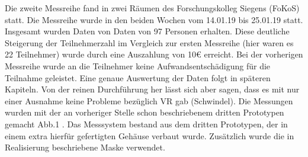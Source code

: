 

Die zweite Messreihe fand in zwei Räumen des Forschungskolleg Siegens (FoKoS) statt. Die Messreihe wurde in den beiden Wochen vom  14.01.19 bis 25.01.19 statt. Insgesamt wurden Daten von Daten von 97 Personen erhalten. Diese deutliche Steigerung der Teilnehmerzahl im Vergleich zur ersten Messreihe (hier waren es 22 Teilnehmer) wurde durch eine Auszahlung von 10€ erreicht. Bei der vorherigen Messreihe wurde an die Teilnehmer keine Aufwandsentschädigung für die Teilnahme geleistet. Eine genaue Auswertung der Daten folgt in späteren Kapiteln. Von der reinen Durchführung her lässt sich aber sagen, dass es mit nur einer Ausnahme keine Probleme bezüglich VR gab (Schwindel). Die Messungen wurden mit der an vorheriger Stelle schon beschriebenem dritten Prototypen gemacht Abb.1 . Das Messsystem bestand aus dem dritten Prototypen, der in einem extra hierfür gefertigten Gehäuse verbaut wurde. Zusätzlich wurde die in Realisierung beschriebene Maske verwendet. 